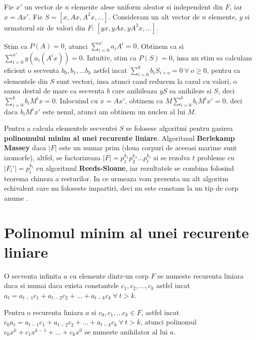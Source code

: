 Fie $x'$ un vector de $n$ elemente alese uniform aleator si independent din $F$,
iar $x = Ax'$. Fie $S = [x, Ax, A^{2}x, \ldots]$.
Consideram un alt vector de $n$ elemente, $y$ si urmatorul sir de valori din $F$: $[yx, yAx, yA^{2}x, \ldots ]$.

Stim ca $P(A) = 0$, atunci $\displaystyle\sum\limits_{i=0}^{n'} a_{i} A^{i} = 0$. Obtinem ca si
$\displaystyle\sum\limits_{i=0}^{n'} y (a_{i} (A^{i} x)) = 0$. Intuitiv, stim ca $P(S) = 0$, insa nu
stim sa calculam eficient o secventa $b_{0}, b_{1}, \ldots b_{k}$ astfel incat
$\displaystyle\sum\limits_{i=0}^{k} b_{i} S_{i+o} = 0 \ \forall \ o \geq 0$, pentru ca elementele din $S$ sunt vectori, insa
atunci cand reducem la cazul cu valori, o sansa destul de mare ca secventa $b$
care anihileaza $yS$ sa anihileze si $S$, deci
$\displaystyle\sum\limits_{i=0}^{k} b_{i} M^{i}x = 0$.
Inlocuind cu $x = Ax'$, obtinem ca $M \displaystyle\sum\limits_{i=0}^{k} b_{i} M^{i} x' = 0$, deci
daca $b_{i} M^{i} x'$ este nenul, atunci am obtinem un nucleu al lui $M$.

Pentru a calcula elementele secventei $S$ se folosesc algoritmi pentru gasirea
\textbf{polinomului minim al unei recurente liniare}. Algoritmul
\textbf{Berlekamp Massey} daca $|F|$ este un numar prim (doua corpuri de
aceeasi marime sunt izomorfe), altfel, se factorizeaza
$|F| = p_{1}^{k_{1}} p_{2}^{k_{2}} \ldots p_{t}^{k_{t}}$ si se rezolva $t$
probleme cu $|F_{i}'| = p_{i}^{k_{i}}$ cu algoritmul \textbf{Reeds-Sloane}, iar
rezultatele se combina folosind teorema chineza a resturilor. In ce urmeaza vom
prezenta un alt algoritm echivalent care nu foloseste impartiri, deci nu este
constans la un tip de corp anume \cite{sugiyama}.

\pagebreak

\section{Polinomul minim al unei recurente liniare}

\begin{defn}
  O secventa infinita $a$ cu elemente dintr-un corp $F$ se numeste recurenta
  liniara daca si numai daca exista constantele $c_{1}, c_{2}, \ldots, c_{k}$
  astfel incat
  $a_{t} = a_{t-1}c_{1} + a_{t-2}c_{2} + \ldots + a_{t-k}c_{k} \ \forall \ t > k$.
\end{defn}

\begin{defn}
  Pentru o recurenta liniara $a$ si $c_{0}, c_{1}, \ldots c_{k} \in F$, astfel
  incat
  $c_{0} a_{t} = a_{t-1}c_{1} + a_{t-2}c_{2} + \ldots + a_{t-k}c_{k} \ \forall \ t > k$,
  atunci polinomul $c_{0} x^{k} + c_{1} x^{k-1} + \ldots + c_{k} x^{0}$ se
  numeste anihilator al lui $a$.
\end{defn}

